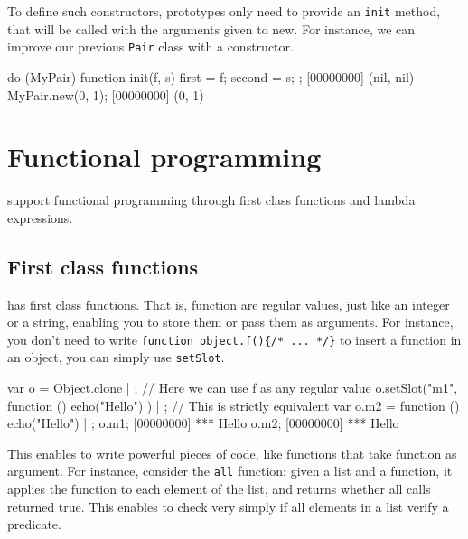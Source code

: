 To define such constructors, prototypes only need to provide an
\lstinline{init} method, that will be called with the arguments given to
new. For instance, we can improve our previous \lstinline{Pair} class
with a constructor.

\begin{urbiscript}
do (MyPair)
{
  function init(f, s)
  {
    first = f;
    second = s;
  }
};
[00000000] (nil, nil)
MyPair.new(0, 1);
[00000000] (0, 1)
\end{urbiscript}


\chapter{Functional programming}
\label{section:functional}

\us support functional programming through first class functions and
lambda expressions.

\section{First class functions}

\us has first class functions. That is, function are regular values,
just like an integer or a string, enabling you to store them or pass
them as arguments. For instance, you don't need to write
\lstinline|function object.f(){/* ... */}| to insert a function in an
object, you can simply use \lstinline{setSlot}.

\begin{urbiscript}
var o = Object.clone | {};
// Here we can use f as any regular value
o.setSlot("m1", function () { echo("Hello") }) | {};
// This is strictly equivalent
var o.m2 = function () { echo("Hello") } | {};
o.m1;
[00000000] *** Hello
o.m2;
[00000000] *** Hello
\end{urbiscript}

This enables to write powerful pieces of code, like functions that
take function as argument. For instance, consider the \lstinline{all}
function: given a list and a function, it applies the function to each
element of the list, and returns whether all calls returned true. This
enables to check very simply if all elements in a list verify a
predicate.

